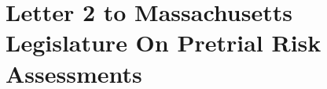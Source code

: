 
\chapter{Letter 2 to Massachusetts Legislature On Pretrial Risk Assessments}
\label{appendix:B}

\newpage


